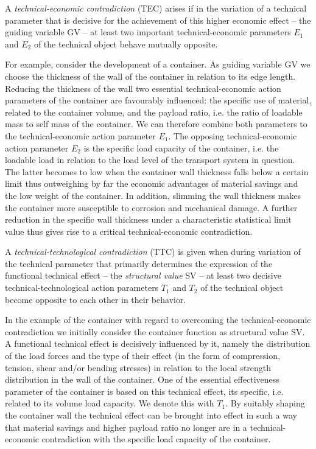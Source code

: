 \documentclass[11pt,a4paper]{article}
\begin{document}
A \emph{technical-economic contradiction} (TEC) arises if in the variation of
a technical parameter that is decisive for the achievement of this higher
economic effect -- the guiding variable GV -- at least two important
technical-economic parameters $E_1$ and $E_2$ of the technical object behave
mutually opposite.

For example, consider the development of a container. As guiding variable GV
we choose the thickness of the wall of the container in relation to its edge
length. Reducing the thickness of the wall two essential technical-economic
action parameters of the container are favourably influenced: the specific use
of material, related to the container volume, and the payload ratio, i.e. the
ratio of loadable mass to self mass of the container.  We can therefore
combine both parameters to the technical-economic action parameter $E_1$. The
opposing technical-economic action parameter $E_2$ is the specific load
capacity of the container, i.e. the loadable load in relation to the load
level of the transport system in question. The latter becomes to low when the
container wall thickness falls below a certain limit thus outweighing by far
the economic advantages of material savings and the low weight of the
container. In addition, slimming the wall thickness makes the container more
susceptible to corrosion and mechanical damage. A further reduction in the
specific wall thickness under a characteristic statistical limit value thus
gives rise to a critical technical-economic contradiction.

A \emph{technical-technological contradiction} (TTC) is given when during
variation of the technical parameter that primarily determines the expression
of the functional technical effect -- the \emph{structural value} SV -- at
least two decisive technical-technological action parameters $T_1$ and $T_2$
of the technical object become opposite to each other in their behavior.

In the example of the container with regard to overcoming the
technical-economic contradiction we initially consider the container function
as structural value SV.  A functional technical effect is decisively
influenced by it, namely the distribution of the load forces and the type of
their effect (in the form of compression, tension, shear and/or bending
stresses) in relation to the local strength distribution in the wall of the
container. One of the essential effectiveness parameter of the container is
based on this technical effect, its specific, i.e. related to its volume load
capacity. We denote this with $T_1$. By suitably shaping the container wall
the technical effect can be brought into effect in such a way that material
savings and higher payload ratio no longer are in a technical-economic
contradiction with the specific load capacity of the container.
\end{document}
